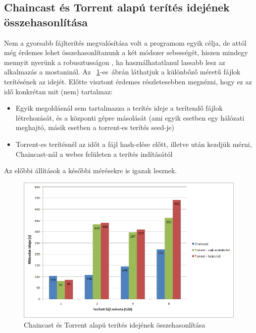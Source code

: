 \subsection{Chaincast és Torrent alapú terítés idejének összehasonlítása}

Nem a gyorsabb fájlterítés megvalósítása volt a programom egyik célja, de attól még érdemes lehet összehasonlítanunk a két módszer sebességét, hiszen mindegy mennyit nyerünk a robusztusságon , ha használhatatlanul lassabb lesz az alkalmazás a mostaninál. Az ~\ref{fig:chaincasttorrrentcomparison}-es~ábrán láthatjuk a különbőző méretű fájlok terítésének az idejét. Előtte visztont érdemes részletesebben megnézni, hogy ez az idő konkrétan mit (nem) tartalmaz:

\begin{itemize}
  \item Egyik megoldásnál sem tartalmazza a terítés ideje a terítendő fájlok létrehozását, és a központi gépre másolását (ami egyik esetben egy hálózati meghajtó, másik esetben a torrent-es terítés seed-je)
  \item Torrent-es terítésnél az időt a fájl hash-elése előtt, illetve után kezdjük mérni, Chaincast-nál a webes felületen a terítés indításától
\end{itemize}

Az előbbi állítások a későbbi mérésekre is igazak lesznek.

\begin{figure}[ht]
	\centering
	\includegraphics[width=150mm, keepaspectratio]{figures/Perf_chaincast_torrent_comparison.png}
	\caption{Chaincast és Torrent alapú terítés idejének összehasonlítása}
	\label{fig:chaincasttorrrentcomparison}
\end{figure}


